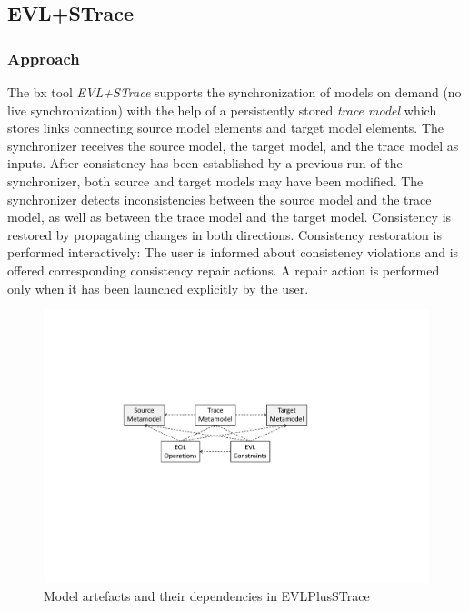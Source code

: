 \clearpage

\subsection{EVL+STrace}
\label{sec:EVLPlusSTrace}



\subsubsection{Approach}
\label{sec:ApproachEVL}

The bx tool \emph{EVL+STrace} \cite{IST2018-Samimi} supports the synchronization of models on demand (no live synchronization) with the help of a persistently stored \emph{trace model} which stores links connecting source model elements and target model elements. The synchronizer receives the source model, the target model, and the trace model as inputs. After consistency has been established by a previous run of the synchronizer, both source and target models may have been modified. The synchronizer detects inconsistencies between the source model and the trace model, as well as between the trace model and the target model. Consistency is restored by propagating changes in both directions. Consistency restoration is performed interactively: The user is informed about consistency violations and is offered corresponding consistency repair actions. A repair action is performed only when it has been launched explicitly by the user.

\begin{figure}[tb!]
	\centering
	\includegraphics[width=0.8\columnwidth]{diagrams/EVLPlusSTraceArtefacts}
	\caption{Model artefacts and their dependencies in EVLPlusSTrace}
	\label{fig:evlartefacts}
\end{figure}

